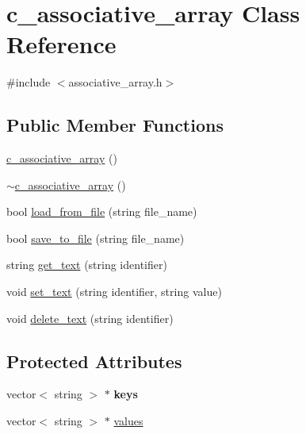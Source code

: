 \hypertarget{classc__associative__array}{\section{c\-\_\-associative\-\_\-array Class Reference}
\label{classc__associative__array}
}


{\ttfamily \#include $<$associative\-\_\-array.\-h$>$}

\subsection*{Public Member Functions}
\begin{DoxyCompactItemize}
\item 
\hyperlink{classc__associative__array_a81ad1750fa1d2c1f48ca77a9c335435f}{c\-\_\-associative\-\_\-array} ()
\item 
\hyperlink{classc__associative__array_a44db0ff9cf78c954d5d8e6645bc3f432}{$\sim$c\-\_\-associative\-\_\-array} ()
\item 
bool \hyperlink{classc__associative__array_a62c94b9c3b92e52885027d77d10d4f0f}{load\-\_\-from\-\_\-file} (string file\-\_\-name)
\item 
bool \hyperlink{classc__associative__array_af01617371af63735362b2a5d2c376ea6}{save\-\_\-to\-\_\-file} (string file\-\_\-name)
\item 
string \hyperlink{classc__associative__array_abc77748614083307465a001ec789ea16}{get\-\_\-text} (string identifier)
\item 
void \hyperlink{classc__associative__array_ab23eae554f876688eead4f6608baa33d}{set\-\_\-text} (string identifier, string value)
\item 
void \hyperlink{classc__associative__array_a32415722135f5d204d77ed739d51f23b}{delete\-\_\-text} (string identifier)
\end{DoxyCompactItemize}
\subsection*{Protected Attributes}
\begin{DoxyCompactItemize}
\item 
\hypertarget{classc__associative__array_a954d95789ca9af971d05509b2c679527}{vector$<$ string $>$ $\ast$ {\bfseries keys}}\label{classc__associative__array_a954d95789ca9af971d05509b2c679527}

\item 
vector$<$ string $>$ $\ast$ \hyperlink{classc__associative__array_a16874608ab16ecb8ef8c9a577c86aa52}{values}
\end{DoxyCompactItemize}


